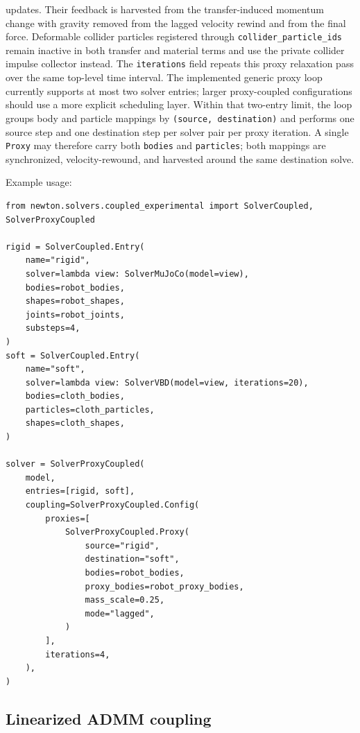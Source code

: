 \documentclass[11pt]{article}
\begin{document}
updates. Their feedback is harvested from the transfer-induced momentum change
with gravity removed from the lagged velocity rewind and from the final force.
Deformable collider particles registered through \texttt{collider\_particle\_ids}
remain inactive in both transfer and material terms and use the private collider
impulse collector instead. The \texttt{iterations} field repeats this proxy
relaxation pass over the same top-level time interval.
The implemented generic proxy loop currently supports at most two solver entries;
larger proxy-coupled configurations should use a more explicit scheduling layer.
Within that two-entry limit, the loop groups body and particle mappings by
\texttt{(source, destination)} and performs one source step and one destination
step per solver pair per proxy iteration. A single \texttt{Proxy} may therefore
carry both \texttt{bodies} and \texttt{particles}; both mappings are synchronized,
velocity-rewound, and harvested around the same destination solve.

Example usage:
\begin{verbatim}
from newton.solvers.coupled_experimental import SolverCoupled, SolverProxyCoupled

rigid = SolverCoupled.Entry(
    name="rigid",
    solver=lambda view: SolverMuJoCo(model=view),
    bodies=robot_bodies,
    shapes=robot_shapes,
    joints=robot_joints,
    substeps=4,
)
soft = SolverCoupled.Entry(
    name="soft",
    solver=lambda view: SolverVBD(model=view, iterations=20),
    bodies=cloth_bodies,
    particles=cloth_particles,
    shapes=cloth_shapes,
)

solver = SolverProxyCoupled(
    model,
    entries=[rigid, soft],
    coupling=SolverProxyCoupled.Config(
        proxies=[
            SolverProxyCoupled.Proxy(
                source="rigid",
                destination="soft",
                bodies=robot_bodies,
                proxy_bodies=robot_proxy_bodies,
                mass_scale=0.25,
                mode="lagged",
            )
        ],
        iterations=4,
    ),
)
\end{verbatim}


\subsection{Linearized ADMM coupling}
\end{document}
